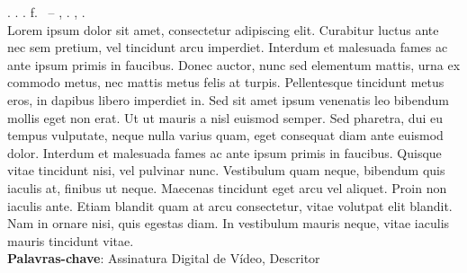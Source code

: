 
\begin{resumo}[RESUMO]
\begin{SingleSpacing}

\imprimirautorcitacao. \imprimirtitulo. \imprimirdata. \pageref {LastPage} f. \imprimirprojeto\ – \imprimirprograma, \imprimirinstituicao. \imprimirlocal, \imprimirdata.\\

Lorem ipsum dolor sit amet, consectetur adipiscing elit. Curabitur luctus ante nec sem pretium, vel tincidunt arcu imperdiet. Interdum et malesuada fames ac ante ipsum primis in faucibus. Donec auctor, nunc sed elementum mattis, urna ex commodo metus, nec mattis metus felis at turpis. Pellentesque tincidunt metus eros, in dapibus libero imperdiet in. Sed sit amet ipsum venenatis leo bibendum mollis eget non erat. Ut ut mauris a nisl euismod semper. Sed pharetra, dui eu tempus vulputate, neque nulla varius quam, eget consequat diam ante euismod dolor. Interdum et malesuada fames ac ante ipsum primis in faucibus. Quisque vitae tincidunt nisi, vel pulvinar nunc. Vestibulum quam neque, bibendum quis iaculis at, finibus ut neque. Maecenas tincidunt eget arcu vel aliquet. Proin non iaculis ante. Etiam blandit quam at arcu consectetur, vitae volutpat elit blandit. Nam in ornare nisi, quis egestas diam. In vestibulum mauris neque, vitae iaculis mauris tincidunt vitae. \\

\textbf{Palavras-chave}: Assinatura Digital de Vídeo, Descritor

\end{SingleSpacing}
\end{resumo}


